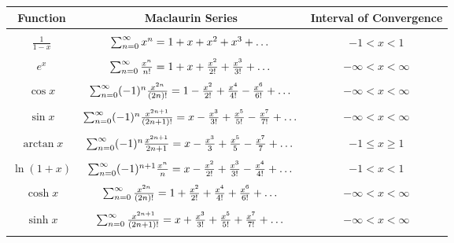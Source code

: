 \documentclass[11pt]{article}
\begin{document}
\begin{table}[H]
    \centering
    \begin{tabular}{|c|c|c|}
    \hline
        Function & Maclaurin Series & Interval of Convergence \\
        \hline
        &&\\
        $\frac{1}{1-x}$ & $\sum_{n=0}^{\infty}x^n=1+x+x^2+x^3+\text{\dots}$ & $-1 < x < 1$
        \\ &&\\
        $e^x$ & $\sum_{n=0}^{\infty}\frac{x^n}{n!}=1+x+\frac{x^2}{2!}+\frac{x^3}{3!}+\text{\dots}$ & $-\infty < x < \infty$
        \\ &&\\
        $\cos x$ & $\sum_{n=0}^{\infty}(-1)^n\frac{x^{2n}}{(2n)!}=1-\frac{x^2}{2!}+\frac{x^4}{4!}-\frac{x^6}{6!}+\text{\dots}$ & $-\infty < x < \infty$
        \\ &&\\
        $\sin x$ & $\sum_{n=0}^{\infty}(-1)^n\frac{x^{2n+1}}{(2n+1)!}=x-\frac{x^3}{3!}+\frac{x^5}{5!}-\frac{x^7}{7!}+\text{\dots}$ & $-\infty < x < \infty$
        \\&&\\
        $\arctan x$ & $\sum_{n=0}^{\infty}(-1)^n\frac{x^{2n+1}}{2n+1}=x-\frac{x^3}{3}+\frac{x^5}{5}-\frac{x^7}{7}+\text{\dots}$ & $-1 \leq x \geq 1$
        \\&&\\
        $\ln(1+x)$ & $\sum_{n=0}^{\infty}(-1)^{n+1}\frac{x^{n}}{n}=x-\frac{x^2}{2!}+\frac{x^3}{3!}-\frac{x^4}{4!}+\text{\dots}$ & $-1 < x < 1$
        \\&&\\
        $\cosh x$ & $\sum_{n=0}^{\infty}\frac{x^{2n}}{(2n)!}=1+\frac{x^2}{2!}+\frac{x^4}{4!}+\frac{x^6}{6!}+\text{\dots}$ & $-\infty < x < \infty$
        \\&&\\
        $\sinh x$ & $\sum_{n=0}^{\infty}\frac{x^{2n+1}}{(2n+1)!}=x+\frac{x^3}{3!}+\frac{x^5}{5!}+\frac{x^7}{7!}+\text{\dots}$ & $-\infty < x < \infty$
        \\&&\\
    \hline
    \end{tabular}
\end{table}
\end{document}
